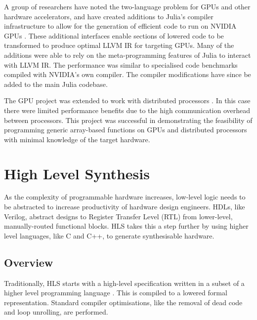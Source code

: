 A group of researchers have noted the two-language problem for GPUs and other hardware accelerators, and have created additions to Julia's compiler infrastructure to allow for the generation of efficient code to run on NVIDIA GPUs \cite{julia_gpu}. %
These additional interfaces enable sections of lowered code to be transformed to produce optimal LLVM IR for targeting GPUs. Many of the additions were able to rely on the meta-programming features of Julia to interact with LLVM IR. %
The performance was similar to specialised code benchmarks compiled with NVIDIA's own compiler. The compiler modifications have since be added to the main Julia codebase. 

The GPU project was extended to work with distributed processors \cite{julia_dist_plat}. In this case there were limited performance benefits due to the high communication overhead between processors. This project was successful in demonstrating the feasibility of programming generic array-based functions on GPUs and distributed processors with minimal knowledge of the target hardware. 
 
\section{High Level Synthesis}

As the complexity of programmable hardware increases, low-level logic needs to be abstracted to increase productivity of hardware design engineers. HDLs, like Verilog, abstract designs to Register Transfer Level (RTL) from lower-level, manually-routed functional blocks. HLS takes this a step further by using higher level languages, like C and C++, to generate synthesisable hardware. 

\subsection{Overview}
Traditionally, HLS starts with a high-level specification written in a subset of a higher level programming language \cite{hls_intro}. This is compiled to a lowered formal representation.  Standard compiler optimisations, like the removal of dead code and loop unrolling, are performed. 

